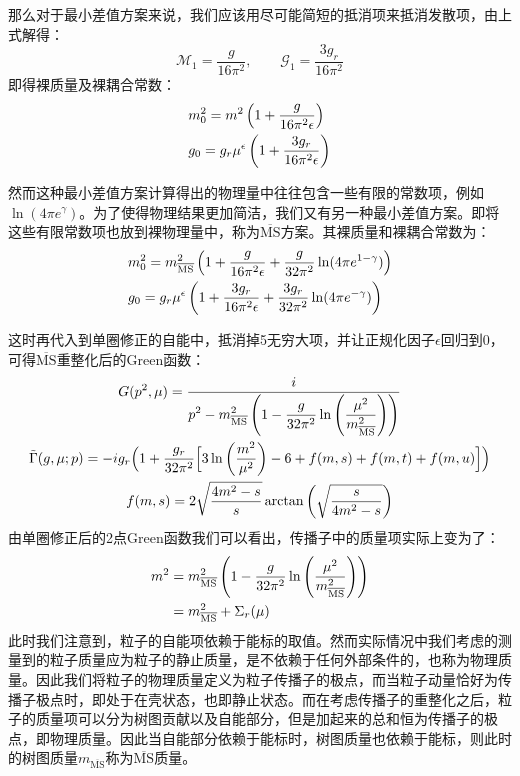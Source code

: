 那么对于最小差值方案来说，我们应该用尽可能简短的抵消项来抵消发散项，由上式解得：
\begin{equation}
\mathscr{M}_1=\frac{g}{16\pi^2},\qquad\mathscr{G}_1=\frac{3g_r}{16\pi^2}
\end{equation}
即得裸质量及裸耦合常数：
\begin{align}
&m_0^2=m^2\left(1+\frac{g}{16\pi^2\epsilon}\right)\notag\\
&g_0=g_r\mu^\epsilon\left(1+\frac{3g_r}{16\pi^2\epsilon}\right)
\end{align}

然而这种最小差值方案计算得出的物理量中往往包含一些有限的常数项，例如$\ln(4\pi e^{\gamma})$。为了使得物理结果更加简洁，我们又有另一种最小差值方案。即将这些有限常数项也放到裸物理量中，称为$\overline{\text{MS}}$方案。其裸质量和裸耦合常数为：
\begin{align}
&m_0^2=m_{\overline{\text{MS}}}^2\left(1+\frac{g}{16\pi^2\epsilon}+\frac{g}{32\pi^2}\ln(4\pi e^{1-\gamma})\right)\notag\\
&g_0=g_r\mu^\epsilon\left(1+\frac{3g_r}{16\pi^2\epsilon}+\frac{3g_r}{32\pi^2}\ln(4\pi e^{-\gamma})\right)
\end{align}

这时再代入到单圈修正的自能中，抵消掉5无穷大项，并让正规化因子$\epsilon$回归到0，可得$\overline{\text{MS}}$重整化后的Green函数：
\begin{gather}
G(p^2,\mu)=\frac{i}{\displaystyle{p^2-m_{\overline{\text{MS}}}^2\left(1-\frac{g}{32\pi^2}\ln\left(\frac{\mu^2}{m_{\overline{\text{MS}}}^2}\right)\right)}}\\
\tilde{\Gamma}(g,\mu;p)=-ig_r\Big(1+\frac{g_r}{32\pi^2}\Big[3\ln\left(\frac{m^2}{\mu^2}\right)-6+f(m,s)+f(m,t)+f(m,u)\Big]\Big)\\
f(m,s)=2\sqrt{\frac{4m^2-s}{s}}\arctan\left(\sqrt{\frac{s}{4m^2-s}}\right)\notag
\end{gather}
由单圈修正后的2点Green函数我们可以看出，传播子中的质量项实际上变为了：
\begin{align}
    m^2&=m_{\overline{\text{MS}}}^2\left(1-\frac{g}{32\pi^2}\ln\left(\frac{\mu^2}{m_{\overline{\text{MS}}}^2}\right)\right)\notag\\
    &=m_{\overline{\text{MS}}}^2+\Sigma_r(\mu)
\end{align}
此时我们注意到，粒子的自能项依赖于能标的取值。然而实际情况中我们考虑的测量到的粒子质量应为粒子的静止质量，是不依赖于任何外部条件的，也称为物理质量。因此我们将粒子的物理质量定义为粒子传播子的极点，而当粒子动量恰好为传播子极点时，即处于在壳状态，也即静止状态。而在考虑传播子的重整化之后，粒子的质量项可以分为树图贡献以及自能部分，但是加起来的总和恒为传播子的极点，即物理质量。因此当自能部分依赖于能标时，树图质量也依赖于能标，则此时的树图质量$m_{\overline{\text{MS}}}$称为$\overline{\text{MS}}$质量。
